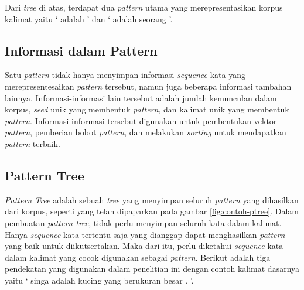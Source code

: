 \noindent Dari \textit{tree} di atas, terdapat dua \textit{pattern} utama yang merepresentasikan korpus kalimat yaitu `{\tagHyponym} adalah {\tagHypernym}' dan `{\tagHyponym} adalah seorang {\tagHypernym}'.

\subsection{Informasi dalam Pattern}
Satu \textit{pattern} tidak hanya menyimpan informasi \textit{sequence} kata yang merepresentesaikan \textit{pattern} tersebut, namun juga beberapa informasi tambahan lainnya. Informasi-informasi lain tersebut adalah jumlah kemunculan dalam korpus, \textit{seed} unik yang membentuk \textit{pattern}, dan kalimat unik yang membentuk \textit{pattern}. Informasi-informasi tersebut digunakan untuk pembentukan vektor \textit{pattern}, pemberian bobot \textit{pattern}, dan melakukan \textit{sorting} untuk mendapatkan \textit{pattern} terbaik.

\subsection{Pattern Tree}
\textit{Pattern Tree} adalah sebuah \textit{tree} yang menyimpan seluruh \textit{pattern} yang dihasilkan dari korpus, seperti yang telah dipaparkan pada gambar \ref{fig:contoh-ptree}. Dalam pembuatan \textit{pattern tree}, tidak perlu menyimpan seluruh kata dalam kalimat. Hanya \textit{sequence} kata tertentu saja yang dianggap dapat menghasilkan \textit{pattern} yang baik untuk diikutsertakan. Maka dari itu, perlu diketahui \textit{sequence} kata dalam kalimat yang cocok digunakan sebagai \textit{pattern}. Berikut adalah tiga pendekatan yang digunakan dalam penelitian ini dengan contoh kalimat dasarnya yaitu `{\tagStart} {\tagHyponym}singa{\tagHyponym} adalah {\tagHypernym}kucing{\tagHypernym} yang berukuran besar . {\tagEnd}'.

